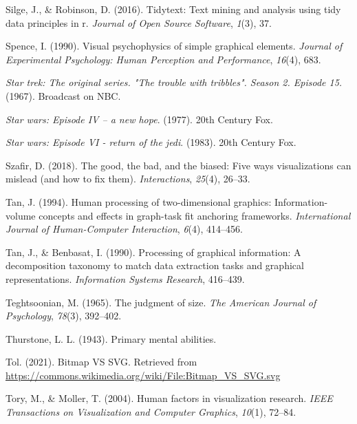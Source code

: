 \documentclass[print]{nuthesis}
\newlength{\cslhangindent}
\newenvironment{CSLReferences}[2]%
{\setlength{\parindent}{0pt}%
\everypar{\setlength{\hangindent}{\cslhangindent}}\ignorespaces}%
{\par}
\begin{document}
\begin{CSLReferences}{1}{0}
\leavevmode{}%
Silge, J., \& Robinson, D. (2016). Tidytext: Text mining and analysis using tidy data principles in r. \emph{Journal of Open Source Software}, \emph{1}(3), 37.

\leavevmode{}%
Spence, I. (1990). Visual psychophysics of simple graphical elements. \emph{Journal of Experimental Psychology: Human Perception and Performance}, \emph{16}(4), 683.

\leavevmode{}%
\emph{Star trek: The original series. "The trouble with tribbles". Season 2. Episode 15.} (1967). Broadcast on NBC.

\leavevmode{}%
\emph{Star wars: Episode IV -- a new hope}. (1977). 20th Century Fox.

\leavevmode{}%
\emph{Star wars: Episode VI - return of the jedi}. (1983). 20th Century Fox.

\leavevmode{}%
Szafir, D. (2018). The good, the bad, and the biased: Five ways visualizations can mislead (and how to fix them). \emph{Interactions}, \emph{25}(4), 26--33.

\leavevmode{}%
Tan, J. (1994). Human processing of two-dimensional graphics: Information-volume concepts and effects in graph-task fit anchoring frameworks. \emph{International Journal of Human-Computer Interaction}, \emph{6}(4), 414--456.

\leavevmode{}%
Tan, J., \& Benbasat, I. (1990). Processing of graphical information: A decomposition taxonomy to match data extraction tasks and graphical representations. \emph{Information Systems Research}, 416--439.

\leavevmode{}%
Teghtsoonian, M. (1965). The judgment of size. \emph{The American Journal of Psychology}, \emph{78}(3), 392--402.

\leavevmode{}%
Thurstone, L. L. (1943). Primary mental abilities.

\leavevmode{}%
Tol. (2021). Bitmap VS SVG. Retrieved from \url{https://commons.wikimedia.org/wiki/File:Bitmap_VS_SVG.svg}

\leavevmode{}%
Tory, M., \& Moller, T. (2004). Human factors in visualization research. \emph{IEEE Transactions on Visualization and Computer Graphics}, \emph{10}(1), 72--84.


\end{CSLReferences}
\end{document}
